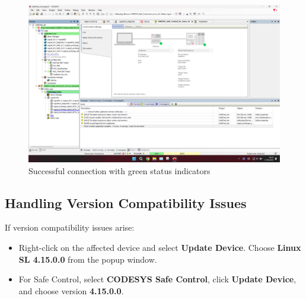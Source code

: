 \documentclass[a4paper,12pt]{article}
\begin{document}
\begin{figure}[H]
	\centering
	\includegraphics[width=\textwidth]{c3.PNG}
	\caption{Successful connection with green status indicators}
\end{figure}

\subsection{Handling Version Compatibility Issues}

If version compatibility issues arise:
\begin{itemize}
	\item Right-click on the affected device and select \textbf{Update Device}. Choose \textbf{Linux SL 4.15.0.0} from the popup window.
	\item For Safe Control, select \textbf{CODESYS Safe Control}, click \textbf{Update Device}, and choose version \textbf{4.15.0.0}.
\end{itemize}
\end{document}
